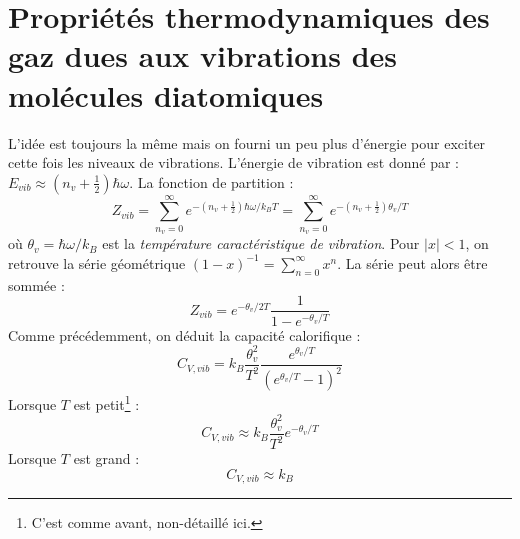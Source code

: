 \documentclass	[11pt, a4paper, openany]{book}
\begin{document}
\section{Propriétés thermodynamiques des gaz dues aux vibrations des molécules 
diatomiques}
L'idée est toujours la même mais on fourni un peu plus d'énergie pour exciter cette fois
les niveaux de vibrations. L'énergie de vibration est donné par : $E_{vib} \approx (n_v
+\frac{1}{2} )\hbar\omega$. La fonction de partition :
\begin{equation}
Z_{vib} = \sum_{n_v=0}^\infty e^{-(n_v+\frac{1}{2})\hbar\omega/k_BT} = \sum_{n_v=0}^\infty
e^{-(n_v+\frac{1}{2})\theta_v/T}
\end{equation}
où $\theta_v = \hbar\omega/k_B$ est la \textit{température caractéristique de vibration}.
Pour $|x|<1$, on retrouve la série géométrique $(1-x)^{-1} = \sum_{n=0}^\infty x^n$. La 
série peut alors être sommée : 
\begin{equation}
Z_{vib} = e^{-\theta_v/2T}\frac{1}{1-e^{-\theta_v/T}}
\end{equation}
Comme précédemment, on déduit la capacité calorifique :
\begin{equation}
C_{V,vib} = k_B \frac{\theta_v^2}{T^2}\frac{e^{\theta_v/T}}{(e^{\theta_v/T}-1)^2}
\end{equation}
Lorsque $T$ est petit\footnote{C'est comme avant, non-détaillé ici.} :
\begin{equation}
C_{V,vib} \approx k_B \frac{\theta_v^2}{T^2}e^{-\theta_v/T}
\end{equation}
Lorsque $T$ est grand :
\begin{equation}
C_{V,vib} \approx k_B
\end{equation}
\end{document}
